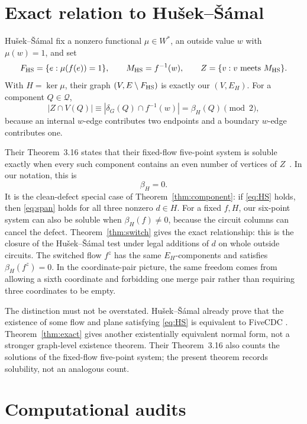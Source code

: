 \documentclass[11pt]{article}
\theoremstyle{definition}
\theoremstyle{remark}
\newcommand{\Q}{\mathcal Q}
\newcommand{\FiveCDC}{\textup{FiveCDC}}
\numberwithin{equation}{section}
\begin{document}
\section{Exact relation to Hu\v{s}ek--\v{S}\'amal}
\label{sec:HS}

Hu\v{s}ek--\v{S}\'amal fix a nonzero functional
\(\mu\in W^*\), an outside value \(w\) with \(\mu(w)=1\), and set
\[
 F_{\rm HS}=\{e:\mu(f(e))=1\},\qquad
 M_{\rm HS}=f^{-1}(w),\qquad
 Z=\{v:v\hbox{ meets }M_{\rm HS}\}.
\]
With \(H=\ker\mu\), their graph
\((V,E\setminus F_{\rm HS})\) is exactly our \((V,E_H)\).
For a component \(Q\in\Q\),
\[
 |Z\cap V(Q)|
 \equiv|\delta_G(Q)\cap f^{-1}(w)|
 =\beta_H(Q)\pmod2,
\]
because an internal \(w\)-edge contributes two endpoints and a boundary
\(w\)-edge contributes one.

Their Theorem~3.16 states that their fixed-flow five-point system is
soluble exactly when every such component contains an even number of
vertices of \(Z\)~\cite[Theorem~3.16]{HusekSamal2026}.  In our notation,
this is
\begin{equation}
                              \beta_H=0.                     \label{eq:HS}
\end{equation}
It is the clean-defect special case of
Theorem~\ref{thm:component}: if \eqref{eq:HS} holds, then
\eqref{eq:span} holds for all three nonzero \(d\in H\).
For a fixed \(f,H\), our six-point system can also be soluble when
\(\beta_H(f)\ne0\), because the circuit columns can cancel the defect.
Theorem~\ref{thm:switch} gives the exact relationship: this is the
closure of the Hu\v{s}ek--\v{S}\'amal test under legal additions of
\(d\) on whole outside circuits.  The switched flow \(f^z\) has the
same \(E_H\)-components and satisfies \(\beta_H(f^z)=0\).  In the
coordinate-pair picture, the same freedom comes from allowing a sixth
coordinate and forbidding one merge pair rather than requiring three
coordinates to be empty.

The distinction must not be overstated.  Hu\v{s}ek--\v{S}\'amal already
prove that the existence of some flow and plane satisfying
\eqref{eq:HS} is equivalent to \FiveCDC
\cite[Observation~3.15 and Conjecture~3.19]{HusekSamal2026}.
Theorem~\ref{thm:exact} gives another existentially equivalent normal
form, not a stronger graph-level existence theorem.  Their
Theorem~3.16 also counts the solutions of the fixed-flow five-point
system; the present theorem records solubility, not an analogous count.

\section{Computational audits}
\label{sec:computation}
\end{document}
